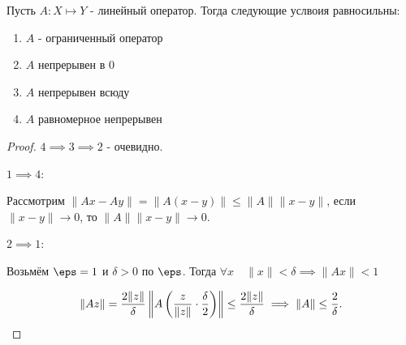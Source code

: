 \begin{theorem} \thmslashn

    Пусть $A : X \mapsto Y$ - линейный оператор. Тогда следующие услвоия равносильны:
    \begin{enumerate}
        \item $A$ - ограниченный оператор
        \item $A$ непрерывен в $0$
        \item $A$ непрерывен всюду
        \item $A$ равномерное непрерывен
    \end{enumerate}
    \begin{proof} \thmslashn

        $4 \implies 3 \implies 2$ - очевидно.

        $1 \implies 4$:

        Рассмотрим $\|Ax - Ay\| = \|A(x-y)\| \le \|A\| \|x-y\|$, если $\|x - y\| \to 0$, то $\|A\|\|x-y\| \to 0$.

        $2 \implies 1$:

        Возьмём $\eps = 1$ и $\delta > 0$ по $\eps$. Тогда $\forall{x}\quad \|x\| < \delta \implies \|Ax\| < 1$

        \[ \|Az\| = \frac{2\|z\|}{\delta} \left\|A\left( \frac{z}{\|z\|} \cdot \frac{\delta}{2} \right) \right\| \le \frac{2\|z\|}{\delta} \implies \|A\| \le \frac{2}{\delta}.\qedhere\] 
    \end{proof}
\end{theorem}
